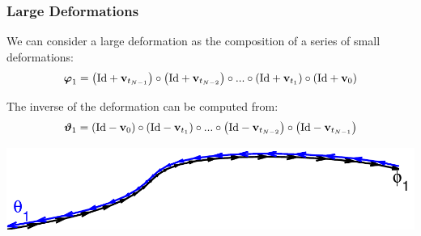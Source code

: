 \documentclass{beamer}
\begin{document}

\begin{frame}
\frametitle{Large Deformations}
We can consider a large deformation as the composition of a series of small deformations:
\begin{eqnarray*}
{\boldsymbol\varphi}_{1} = \left(\mathrm{Id} + {\bf v}_{t_{N-1}}\right) \circ  \left(\mathrm{Id} + {\bf v}_{t_{N-2}}\right) \circ ... \circ \left(\mathrm{Id} + {\bf v}_{t_1}\right) \circ \left(\mathrm{Id} + {\bf v}_0\right)
\end{eqnarray*}

The inverse of the deformation can be computed from:
\begin{eqnarray*}
{\boldsymbol\vartheta}_{1} = \left(\mathrm{Id} - {\bf v}_0\right) \circ  \left(\mathrm{Id} - {\bf v}_{t_1}\right) \circ ... \circ \left(\mathrm{Id} - {\bf v}_{t_{N-2}}\right) \circ \left(\mathrm{Id} - {\bf v}_{t_{N-1}}\right)
\end{eqnarray*}

\includegraphics[width=\textwidth]{trajectory0}
\end{frame}



\end{document}
